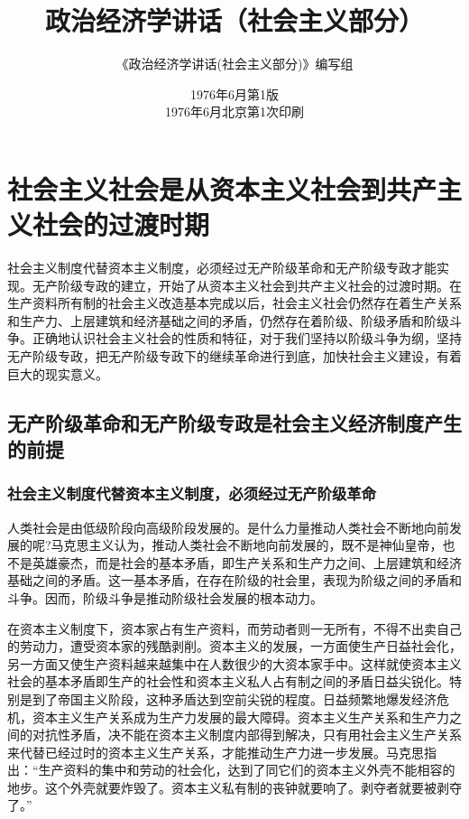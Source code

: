 \documentclass{book}
\begin{document}
\date{1976年6月第1版\\
1976年6月北京第1次印刷}
\title{\textbf{
政治经济学讲话（社会主义部分）
}}
\author{《政治经济学讲话(社会主义部分)》编写组}
\maketitle

\tableofcontents

\chapter{社会主义社会是从资本主义社会到共产主义社会的过渡时期}

社会主义制度代替资本主义制度，必须经过无产阶级革命和无产阶级专政才能实现。无产阶级专政的建立，开始了从资本主义社会到共产主义社会的过渡时期。在生产资料所有制的社会主义改造基本完成以后，社会主义社会仍然存在着生产关系和生产力、上层建筑和经济基础之间的矛盾，仍然存在着阶级、阶级矛盾和阶级斗争。正确地认识社会主义社会的性质和特征，对于我们坚持以阶级斗争为纲，坚持无产阶级专政，把无产阶级专政下的继续革命进行到底，加快社会主义建设，有着巨大的现实意义。

\section{无产阶级革命和无产阶级专政是社会主义经济制度产生的前提}

\subsection{社会主义制度代替资本主义制度，必须经过无产阶级革命}

人类社会是由低级阶段向高级阶段发展的。是什么力量推动人类社会不断地向前发展的呢?马克思主义认为，推动人类社会不断地向前发展的，既不是神仙皇帝，也不是英雄豪杰，而是社会的基本矛盾，即生产关系和生产力之间、上层建筑和经济基础之间的矛盾。这一基本矛盾，在存在阶级的社会里，表现为阶级之间的矛盾和斗争。因而，阶级斗争是推动阶级社会发展的根本动力。

在资本主义制度下，资本家占有生产资料，而劳动者则一无所有，不得不出卖自己的劳动力，遭受资本家的残酷剥削。资本主义的发展，一方面使生产日益社会化，另一方面又使生产资料越来越集中在人数很少的大资本家手中。这样就使资本主义社会的基本矛盾即生产的社会性和资本主义私人占有制之间的矛盾日益尖锐化。特别是到了帝国主义阶段，这种矛盾达到空前尖锐的程度。日益频繁地爆发经济危机，资本主义生产关系成为生产力发展的最大障碍。资本主义生产关系和生产力之间的对抗性矛盾，决不能在资本主义制度内部得到解决，只有用社会主义生产关系来代替已经过时的资本主义生产关系，才能推动生产力进一步发展。马克思指出：“生产资料的集中和劳动的社会化，达到了同它们的资本主义外壳不能相容的地步。这个外壳就要炸毁了。资本主义私有制的丧钟就要响了。剥夺者就要被剥夺了。”
\end{document}
